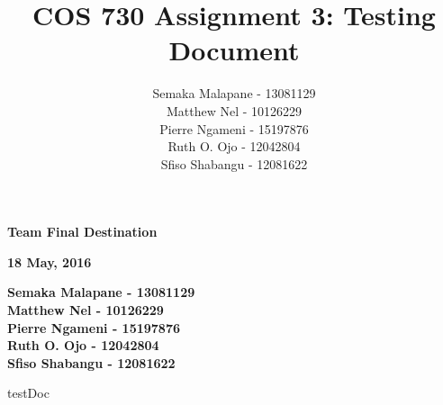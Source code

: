 \documentclass[a4paper]{article}
\title{COS 730 Assignment 3: Testing Document}
\author{Semaka Malapane -  13081129 \\
		Matthew Nel -  10126229\\
		Pierre Ngameni - 15197876 \\
		Ruth O. Ojo - 12042804 \\
		Sfiso Shabangu - 12081622 }
\begin{document}
	


\begin{titlepage}
    \begin{center}
        \vspace*{1.5cm}        
        \Huge
        \textbf{Team Final Destination}

        \vspace{1.5cm}        
        \large
        \textbf{18 May, 2016}
        
        \vspace{1.0cm}
        
		\large       
	        \textbf{Semaka Malapane -  13081129}\\
			\textbf{Matthew Nel - 10126229} \\
			\textbf{Pierre Ngameni -  15197876}\\
			\textbf{Ruth O. Ojo - 12042804 }\\
			\textbf{Sfiso Shabangu - 12081622}        
        
        
    \end{center}
\end{titlepage}


\pagebreak
\tableofcontents
\pagebreak

{testDoc}



\end{document}

